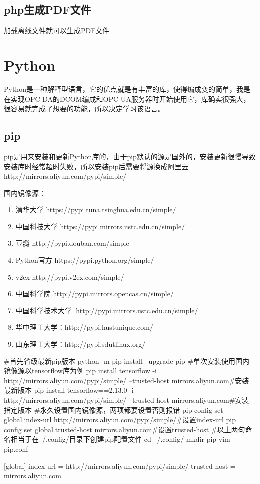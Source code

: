 \subsection{php生成PDF文件}
加载离线文件就可以生成PDF文件
\section{Python}
Python是一种解释型语言，它的优点就是有丰富的库，使得编成变的简单，我是在实现OPC DA的DCOM编成和OPC UA服务器时开始使用它，库确实很强大，很容易就完成了想要的功能，所以决定学习该语言。
\subsection{pip}
pip是用来安装和更新Python库的，由于pip默认的源是国外的，安装更新很慢导致安装库时经常超时失败，所以安装pip后需要将源换成阿里云 http://mirrors.aliyun.com/pypi/simple/

国内镜像源：
\begin{enumerate}
	\item 清华大学 https://pypi.tuna.tsinghua.edu.cn/simple/
	\item 中国科技大学 https://pypi.mirrors.ustc.edu.cn/simple/
	\item 豆瓣 http://pypi.douban.com/simple
	\item Python官方 https://pypi.python.org/simple/
	\item v2ex http://pypi.v2ex.com/simple/
	\item 中国科学院 http://pypi.mirrors.opencas.cn/simple/
	\item 中国科学技术大学 [http://pypi.mirrors.ustc.edu.cn/simple/
	\item 华中理工大学：http://pypi.hustunique.com/
	\item 山东理工大学：http://pypi.sdutlinux.org/
\end{enumerate}
\begin{shell}
#首先省级最新pip版本
python -m pip install --upgrade pip
#单次安装使用国内镜像源以tensorflow库为例
pip install tensorflow -i http://mirrors.aliyun.com/pypi/simple/ --trusted-host mirrors.aliyun.com#安装最新版本
pip install tensorflow==2.13.0 -i http://mirrors.aliyun.com/pypi/simple/ --trusted-host mirrors.aliyun.com#安装指定版本
#永久设置国内镜像源，两项都要设置否则报错
pip config set global.index-url http://mirrors.aliyun.com/pypi/simple/#设置index-url
pip config set global.trusted-host mirrors.aliyun.com#设置trusted-host
#以上两句命名相当于在~/.config/目录下创建pip配置文件
cd ~/.config/
mkdir pip
vim pip.conf

[global]
index-url = http://mirrors.aliyun.com/pypi/simple/
trusted-host = mirrors.aliyun.com
\end{shell}

